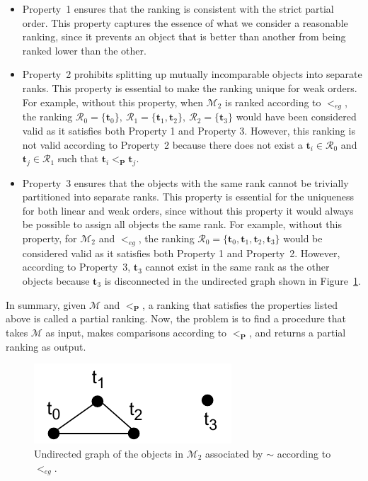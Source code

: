 \documentclass[acmsmall,screen, review]{acmart}
\begin{document}
\begin{itemize}
	\item   Property~1 ensures that the ranking is consistent with the strict partial order.
	This property captures the essence of what we consider a reasonable ranking, since it prevents an object that is better than another from being ranked lower than the other.
	\item  Property~2 prohibits splitting up mutually incomparable objects into separate ranks. This property is essential to make the ranking unique for weak orders. For example, without this property, when $\mathcal{M}_2$ is ranked according to $<_{eg}$, the ranking $\mathcal{R}_0 = \{\mathbf{t}_0\}, \ \mathcal{R}_1 = \{\mathbf{t}_1, \mathbf{t}_2\}, \ \mathcal{R}_2 = \{\mathbf{t}_3\}$ would have been considered valid as it satisfies both Property 1 and Property 3. However, this ranking is not valid according to Property~2 because there does not exist a $ \mathbf{t}_i \in \mathcal{R}_0$ and $\mathbf{t}_j \in \mathcal{R}_1$ such that $\mathbf{t}_i <_{\mathbf{P}} \mathbf{t}_j$. 
	
	
	\item  Property~3 ensures that the objects with the same rank cannot be trivially partitioned into separate ranks. This property is essential for the uniqueness for both linear and weak orders, since without this property it would always be possible to assign all objects the same rank.  For example, without this property, for $\mathcal{M}_2$ and $<_{eg}$, the ranking $\mathcal{R}_0 = \{\mathbf{t}_0, \mathbf{t}_1, \mathbf{t}_2, \mathbf{t}_3\}$ would be considered valid as it satisfies both Property 1 and Property~2. However, according to Property~3, $\mathbf{t}_3$ cannot exist in the same rank as the other objects because $\mathbf{t}_3$ is disconnected in the undirected graph shown in Figure~\ref{fig3:undirected}.
\end{itemize}
In summary, given $\mathcal{M}$ and $<_{\mathbf{P}}$, a ranking that satisfies the properties listed above is called a partial ranking. Now, the problem is to find a procedure that takes $\mathcal{M}$ as input, makes comparisons according to $<_{\mathbf{P}}$, and returns a partial ranking as output.

 \begin{figure}[h!]
	\centering
	\includegraphics[width=0.2\linewidth]{fig/ch3/undirected}
	\caption{Undirected graph of the objects in $\mathcal{M}_2$ associated by $\sim$ according to $<_{eg}$.}
	\label{fig3:undirected}
\end{figure}
\end{document}
